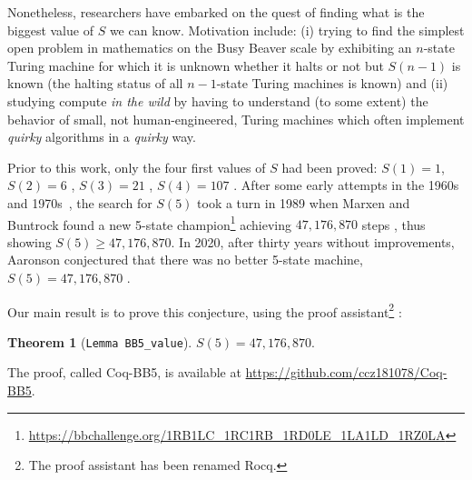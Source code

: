 \documentclass{easychair}
\newcommand{\BBtheFifth}{47{,}176{,}870}
\newcommand{\CoqBB}{Coq-BB5\xspace}
\theoremstyle{definition} %
\numberwithin{equation}{section}
\theoremstyle{definition} %
\newtheorem*{theorem*}{Theorem}
\begin{document}
Nonetheless, researchers have embarked on the quest of finding what is the biggest value of $S$ we can know. Motivation include: (i) trying to find the simplest open problem in mathematics on the Busy Beaver scale by exhibiting an $n$-state Turing machine for which it is unknown whether it halts or not but $S(n-1)$ is known (\ie the halting status of all $n-1$-state Turing machines is known) and (ii) studying compute \textit{in the wild} by having to understand (to some extent) the behavior of small, not human-engineered, Turing machines which often implement \textit{quirky} algorithms in a \textit{quirky} way.


Prior to this work, only the four first values of $S$ had been proved: $S(1)=1$, $S(2)=6$ \cite{Rado_1962}, $S(3) = 21$ \cite{Lin1963}, $S(4) = 107$ \cite{Brady83}. After some early attempts in the 1960s and 1970s~\cite{PMichel_website,michel2019busy}, the search for $S(5)$ took a turn in 1989 when Marxen and Buntrock found a new 5-state champion\footnote{\url{https://bbchallenge.org/1RB1LC_1RC1RB_1RD0LE_1LA1LD_1RZ0LA}} achieving $\BBtheFifth$ steps \cite{Marxen_1990}, thus showing $S(5) \geq \BBtheFifth$. In 2020, after thirty years without improvements, Aaronson conjectured that there was no better 5-state machine, \ie $S(5) = \BBtheFifth$ \cite{BusyBeaverFrontier}.

Our main result is to prove this conjecture, using the \Coq proof assistant\footnote{The \Coq proof assistant has been renamed Rocq.} \cite{Coq8.20}:

\begin{theorem*}[\texttt{Lemma BB5\_value}]
  $S(5) = \BBtheFifth$.
\end{theorem*}

The proof, called \CoqBB, is available at \url{https://github.com/ccz181078/Coq-BB5}.
\end{document}
